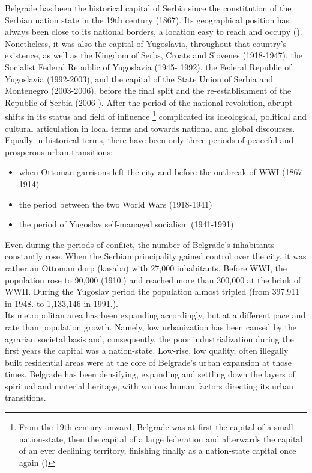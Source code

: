 \documentclass[11pt]{report}
\begin{document}
{{{{Belgrade has been the historical capital of Serbia since the constitution of the Serbian nation state in the 19th century (1867). Its geographical position has always been close to its national borders, a location easy to reach and occupy (\href{Doytchinov}{\citealt{doytchinov_capital_2015}}).
Nonetheless, it was also the capital of Yugoslavia, throughout that country’s existence, as well as the Kingdom of Serbs, Croats and Slovenes (1918-1947), the Socialist Federal Republic of Yugoslavia (1945- 1992), the Federal Republic of Yugoslavia (1992-2003), and the capital of the State Union of Serbia and Montenegro (2003-2006), before the final split and the re-establishment of the Republic of Serbia (2006-). After the period of the national revolution, abrupt shifts in its status and field of influence
\footnote{From the 19th century onward, Belgrade was at first the capital of a small nation-state, then the capital of a large federation and afterwards the capital of an ever declining territory, finishing finally as a nation-state capital once again (\href{Hirt}{\citealt{hirt_belgrade_2009}})}
complicated its ideological, political and cultural articulation in local terms and towards national and global discourses.
\\

Equally in historical terms, there have been only three periods of peaceful and prosperous urban transitions:

\begin{itemize}
\item when Ottoman garrisons left the city and before the outbreak of WWI (1867-1914)
\item the period between the two World Wars (1918-1941)
\item  the period of Yugoslav self-managed socialism (1941-1991)
\end{itemize}

Even during the periods of conflict, the number of Belgrade’s inhabitants constantly rose. When the Serbian principality gained control over the city, it was rather an Ottoman dorp (kasaba) with 27,000 inhabitants. Before WWI, the population rose to 90,000 (1910.) and reached more than 300,000 at the brink of WWII. During the Yugoslav period the population almost tripled (from 397,911 in 1948. to 1,133,146 in 1991.).
\\

Its metropolitan area has been expanding accordingly, but at a different pace and rate than population growth. Namely, low urbanization has been caused by the agrarian societal basis and, consequently, the poor industrialization during the first years the capital was a nation-state. Low-rise, low quality, often illegally built residential areas were at the core of Belgrade’s urban expansion at those times. Belgrade has been densifying, expanding and settling down the layers of spiritual and material heritage, with various human factors directing its urban transitions.
\\

}}}}
\end{document}
